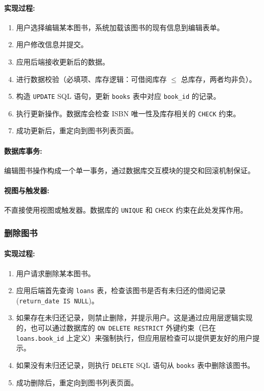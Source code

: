 \documentclass[11pt, a4paper]{article}
\begin{document}
\paragraph{实现过程:}
\begin{enumerate}
    \item 用户选择编辑某本图书，系统加载该图书的现有信息到编辑表单。
    \item 用户修改信息并提交。
    \item 应用后端接收更新后的数据。
    \item 进行数据校验（必填项、库存逻辑：可借阅库存 $\leq$ 总库存，两者均非负）。
    \item 构造 \texttt{UPDATE} SQL 语句，更新 \texttt{books} 表中对应 \texttt{book\_id} 的记录。
    \item 执行更新操作。数据库会检查 ISBN 唯一性及库存相关的 \texttt{CHECK} 约束。
    \item 成功更新后，重定向到图书列表页面。
\end{enumerate}
\paragraph{数据库事务:}
编辑图书操作构成一个单一事务，通过数据库交互模块的提交和回滚机制保证。
\paragraph{视图与触发器:}
不直接使用视图或触发器。数据库的 \texttt{UNIQUE} 和 \texttt{CHECK} 约束在此处发挥作用。

\subsubsection{删除图书}
\paragraph{实现过程:}
\begin{enumerate}
    \item 用户请求删除某本图书。
    \item 应用后端首先查询 \texttt{loans} 表，检查该图书是否有未归还的借阅记录 (\texttt{return\_date IS NULL})。
    \item 如果存在未归还记录，则禁止删除，并提示用户。这是通过应用层逻辑实现的，也可以通过数据库的 \texttt{ON DELETE RESTRICT} 外键约束（已在 \texttt{loans.book\_id} 上定义）来强制执行，但应用层检查可以提供更友好的用户提示。
    \item 如果没有未归还记录，则执行 \texttt{DELETE} SQL 语句从 \texttt{books} 表中删除该图书。
    \item 成功删除后，重定向到图书列表页面。
\end{enumerate}
\end{document}
